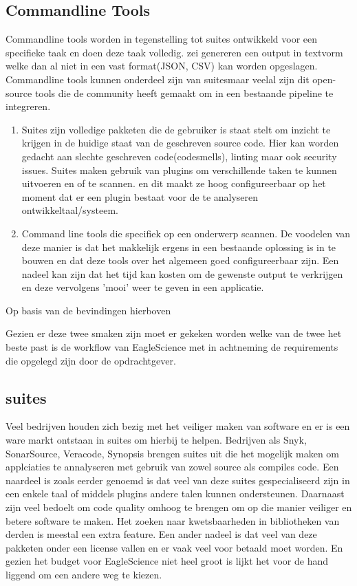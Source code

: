 \subsection{Commandline Tools}
Commandline tools worden in tegenstelling tot suites ontwikkeld voor een specifieke taak en doen deze taak volledig. zei genereren een output in textvorm welke dan al niet in een vast format(JSON, CSV) kan worden opgeslagen.
Commandline tools kunnen onderdeel zijn van suitesmaar veelal zijn dit open-source tools die de community heeft gemaakt om in een bestaande pipeline te integreren.

\begin{enumerate}
    \item Suites zijn volledige pakketen die de gebruiker is staat stelt om inzicht te krijgen in de huidige staat van de geschreven source code. Hier kan worden gedacht aan slechte geschreven code(codesmells), linting maar ook security issues. Suites maken gebruik van plugins om verschillende taken te kunnen uitvoeren en of te scannen. en dit maakt ze hoog configureerbaar op het moment dat er een plugin bestaat voor de te analyseren ontwikkeltaal/systeem.
    \item Command line tools die specifiek op een onderwerp scannen. De voodelen van deze manier is dat het makkelijk ergens in een bestaande oplossing is in te bouwen en dat deze tools over het algemeen goed configureerbaar zijn. Een nadeel kan zijn dat het tijd kan kosten om de gewenste output te verkrijgen en deze vervolgens 'mooi' weer te geven in een applicatie.
\end{enumerate}




Op basis van de bevindingen hierboven


Gezien er deze twee smaken zijn moet er gekeken worden welke van de twee het beste past is de workflow van EagleScience met in achtneming de requirements die opgelegd zijn door de opdrachtgever.

\subsection{suites}
Veel bedrijven houden zich bezig met het veiliger maken van software en er is een ware markt ontstaan in suites om hierbij te helpen. Bedrijven als Snyk, SonarSource, Veracode, Synopsis brengen suites uit die het mogelijk maken om applciaties te annalyseren met gebruik van zowel source als compiles code. Een naardeel is zoals eerder genoemd is dat veel van deze suites gespecialiseerd zijn in een enkele taal of middels plugins andere talen kunnen ondersteunen. Daarnaast zijn veel bedoelt om code quality omhoog te brengen om op die manier veiliger en betere software te maken. Het zoeken naar kwetsbaarheden in bibliotheken van derden is meestal een extra feature. Een ander nadeel is dat veel van deze pakketen onder een license vallen en er vaak veel voor betaald moet worden. En gezien het budget voor EagleScience niet heel groot is lijkt het voor de hand liggend om een andere weg te kiezen.
